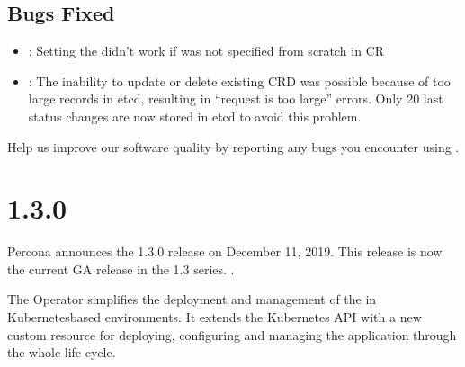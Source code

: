\documentclass[letterpaper,10pt,english]{sphinxmanual}
\begin{document}
\subsection{Bugs Fixed}
\label{\detokenize{RN/Kubernetes-Operator-for-PSMONGODB-RN1.4.0:bugs-fixed}}\begin{itemize}
\item {} 
: Setting the  didn’t work if was not specified from scratch in CR

\item {} 
: The inability to update or delete existing CRD was possible because of too large records in etcd, resulting in “request is too large” errors. Only 20 last status changes are now stored in etcd to avoid this problem.

\end{itemize}

Help us improve our software quality by reporting any bugs you encounter using
.


\section{ 1.3.0}
\label{\detokenize{RN/Kubernetes-Operator-for-PSMONGODB-RN1.3.0:percona-kubernetes-operator-for-percona-server-for-mongodb-1-3-0}}\label{\detokenize{RN/Kubernetes-Operator-for-PSMONGODB-RN1.3.0::doc}}
Percona announces the  1.3.0 release on December 11, 2019. This release is now the current
GA release in the 1.3 series. .

The Operator simplifies the deployment and management of the 
in Kubernetes\sphinxhyphen{}based environments. It extends the Kubernetes API with a new
custom resource for deploying, configuring and managing the application through
the whole life cycle.
\end{document}
